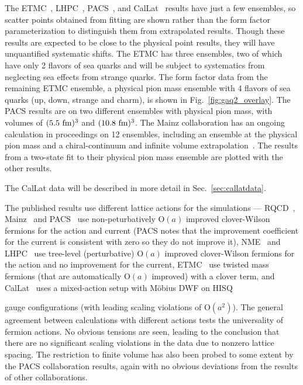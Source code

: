 \documentclass{ar-1col}
\begin{document}
The ETMC~\cite{Alexandrou:2020okk}, LHPC~\cite{Hasan:2017wwt},
 PACS~\cite{Ishikawa:2018rew,Shintani:2018ozy,Ishikawa:2021eut}, and CalLat~\cite{Meyer:2021vfq}
 results have just a few ensembles, so scatter points obtained from fitting
 are shown rather than the form factor parameterization to distinguish
 them from extrapolated results.
Though these results are expected to be close to the physical point results,
 they will have unquantified systematic shifts.
The ETMC has three ensembles, two of which have only 2 flavors of sea quarks
 and will be subject to systematics from neglecting sea effects from strange quarks.
The form factor data from the remaining ETMC ensemble,
 a physical pion mass ensemble with 4 flavors of sea quarks (up, down, strange and charm),
 is shown in Fig.~\ref{fig:gaq2_overlay}.
The PACS results are on two different ensembles with physical pion mass,
 with volumes of $(5.5~{\rm fm})^3$ and $(10.8~{\rm fm})^3$.
The Mainz collaboration has an ongoing calculation in proceedings on 12 ensembles,
 including an ensemble at the physical pion mass
 and a chiral-continuum and infinite volume extrapolation~\cite{Djukanovic:2021yqg}.
The results from a two-state fit to their physical pion mass ensemble
 are plotted with the other results.%
\begin{marginnote}
\end{marginnote}%
The CalLat data will be described in more detail in Sec.~\ref{sec:callatdata}.


The published results use different lattice actions for the simulations ---
RQCD~\cite{RQCD:2019jai}, Mainz~\cite{Djukanovic:2021yqg} and PACS~\cite{Ishikawa:2018rew,Shintani:2018ozy,Ishikawa:2021eut} use non-peturbatively $\mathrm{O}(a)$ improved clover-Wilson fermions for the action and current (PACS notes that the improvement coefficient for the current is consistent with zero so they do not improve it),
NME~\cite{Park:2021ypf} and LHPC~\cite{Hasan:2017wwt} use tree-level (perturbative) $\mathrm{O}(a)$ improved clover-Wilson fermions for the action and no improvement for the current,
 ETMC~\cite{Alexandrou:2020okk} use twisted mass fermions (that are automatically $\mathrm{O}(a)$ improved) with a clover term,
 and CalLat~\cite{Meyer:2021vfq} uses a mixed-action setup with M\"obius DWF
 on HISQ~\cite{MILC:2012znn}%
 \begin{marginnote}
 \end{marginnote}%
 gauge configurations (with leading scaling violations of $\mathrm{O}(a^2)$).
The general agreement between calculations with different actions tests
 the universality of fermion actions.
No obvious tensions are seen,
 leading to the conclusion that there are no significant scaling violations
 in the data due to nonzero lattice spacing.
The restriction to finite volume has also been probed to some extent by
 the PACS collaboration results,
 again with no obvious deviations from the results of other collaborations.
\end{document}
